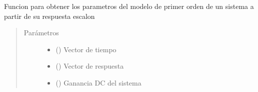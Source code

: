 \documentclass[letterpaper,10pt,spanish]{sphinxmanual}
\begin{document}
\begin{fulllineitems}
\label{\detokenize{codigos/rutinas_PID:rutinas_PID.model_method}}
Funcion para obtener los parametros del modelo de primer orden de un sistema a partir de su respuesta escalon
\begin{quote}\begin{description}
\item[{Parámetros}] \leavevmode\begin{itemize}
\item {} 
 () \textendash{} Vector de tiempo

\item {} 
 () \textendash{} Vector de respuesta

\item {} 
 () \textendash{} Ganancia DC del sistema

\end{itemize}

\end{description}\end{quote}

\end{fulllineitems}

\end{document}
